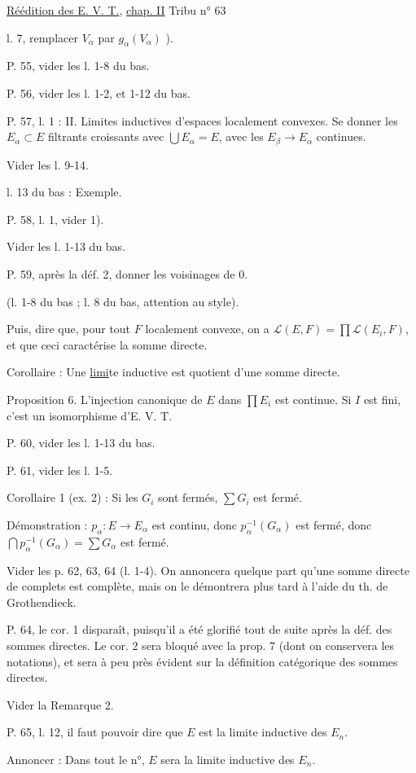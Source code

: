 \uline{Réédition des E. V. T.}, \uline{chap. II} \hfill Tribu n° 63

l. 7, remplacer $V_\alpha$ par $g_\alpha(V_\alpha)$ ).

P. 55, vider les l. 1-8 du bas.

P. 56, vider les l. 1-2, et 1-12 du bas.

P. 57, l. 1 : II. Limites inductives d'espaces localement convexes. Se donner les $E_\alpha\subset E$ filtrants croissants avec $\bigcup E_\alpha=E$, avec les $E_\beta\to E_\alpha$ continues.

Vider les l. 9-14.

l. 13 du bas : Exemple.

P. 58, l. 1, vider 1).

Vider les l. 1-13 du bas.

P. 59, après la déf. 2, donner les voisinages de $0$.

(l. 1-8 du bas ; l. 8 du bas, attention au style).

Puis, dire que, pour tout $F$ localement convexe, on a $\mathscr{L}(E,F)=\prod\mathscr{L}(E_i,F)$, et que ceci caractérise la somme directe.

Corollaire : Une \uline{limi}te inductive est quotient d'une somme directe.

Proposition 6. L'injection canonique de $E$ dans $\prod E_i$ est continue. Si $I$ est fini, c'est un isomorphisme d'E. V. T.

P. 60, vider les l. 1-13 du bas.

P. 61, vider les l. 1-5.

Corollaire 1 (ex. 2) : Si les $G_i$ sont fermés, $\sum G_i$ est fermé.

Démonstration : $p_\alpha:E\to E_\alpha$ est continu, donc $p_\alpha^{-1}(G_\alpha)$ est fermé, donc $\bigcap p_\alpha^{-1}(G_\alpha)=\sum G_\alpha$ est fermé.

Vider les p. 62, 63, 64 (l. 1-4). On annoncera quelque part qu'une somme directe de complets est complète, mais on le démontrera plus tard à l'aide du th. de Grothendieck.

P. 64, le cor. 1 disparaît, puisqu'il a été glorifié tout de suite après la déf. des sommes directes. Le cor. 2 sera bloqué avec la prop. 7 (dont on conservera les notations), et sera à peu près évident sur la définition catégorique des sommes directes.

Vider la Remarque 2.

P. 65, l. 12, il faut pouvoir dire que $E$ est la limite inductive des $E_n$.

Annoncer : Dans tout le n°, $E$ sera la limite inductive des $E_n$.
